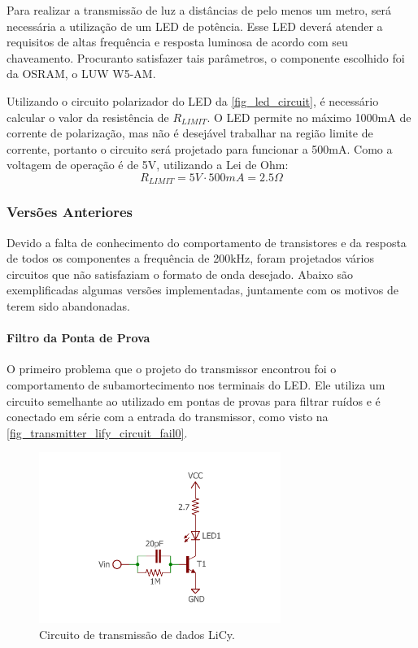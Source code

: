 		Para realizar a transmissão de luz a distâncias de pelo menos um metro, será necessária a utilização de um LED de potência. Esse LED deverá atender a requisitos de altas frequência e resposta luminosa de acordo com seu chaveamento. Procuranto satisfazer tais parâmetros, o componente escolhido foi da OSRAM, o LUW W5-AM.

		Utilizando o circuito polarizador do LED da \autoref{fig_led_circuit}, é necessário calcular o valor da resistência de $R_{LIMIT}$. O LED permite no máximo 1000mA de corrente de polarização, mas não é desejável trabalhar na região limite de corrente, portanto o circuito será projetado para funcionar a 500mA. Como a voltagem de operação é de 5V, utilizando a Lei de Ohm:
		\begin{equation}
		R_{LIMIT} = 5V \cdot 500mA = 2.5\Omega
		\end{equation}
		
		
	\subsubsection{Versões Anteriores}
		
		Devido a falta de conhecimento do comportamento de transistores e da resposta de todos os componentes a frequência de 200kHz, foram projetados vários circuitos que não satisfaziam o formato de onda desejado. Abaixo são exemplificadas algumas versões implementadas, juntamente com os motivos de terem sido abandonadas.
		
		\paragraph{Filtro da Ponta de Prova}
		
		O primeiro problema que o projeto do transmissor encontrou foi o comportamento de subamortecimento nos terminais do LED. Ele utiliza um circuito semelhante ao utilizado em pontas de provas para filtrar ruídos e é conectado em série com a entrada do transmissor, como visto na \autoref{fig_transmitter_lify_circuit_fail0}.
		
		\begin{figure}[htb]
			\caption{\label{fig_transmitter_lify_circuit_fail0} Circuito de transmissão de dados LiCy.}
			\centering		%
			\includegraphics[width=0.7\textwidth, trim={2cm 1cm 2cm 2cm}, clip]{circuits/transmitter_fail0.pdf}
		\end{figure}
		
